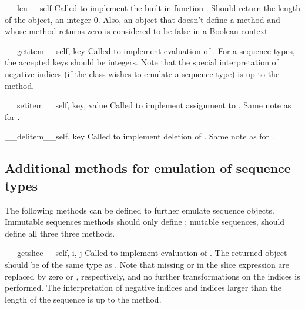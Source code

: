 \begin{methoddescni}{__len__}{self}
Called to implement the built-in function
.  Should return the length of the
object, an integer \code{>=} 0.  Also, an object that doesn't define a
 method and whose  method
returns zero is considered to be false in a Boolean context.
\end{methoddescni}

\begin{methoddescni}{__getitem__}{self, key}
Called to implement evaluation of .
For a sequence types, the accepted keys should be integers.  Note that the
special interpretation of negative indices (if the class wishes to
emulate a sequence type) is up to the  method.
\end{methoddescni}

\begin{methoddescni}{__setitem__}{self, key, value}
Called to implement assignment to .  Same
note as for .
\end{methoddescni}

\begin{methoddescni}{__delitem__}{self, key}
Called to implement deletion of .  Same
note as for .
\end{methoddescni}


\subsection{Additional methods for emulation of sequence types%
  \label{sequence-methods}}

The following methods can be defined to further emulate sequence
objects.  Immutable sequences methods should only define
; mutable sequences, should define all three
three methods.

\begin{methoddescni}{__getslice__}{self, i, j}
Called to implement evaluation of .
The returned object should be of the same type as .  Note
that missing  or  in the slice expression are replaced
by zero or , respectively, and no further
transformations on the indices is performed.  The interpretation of
negative indices and indices larger than the length of the sequence is
up to the method.
\end{methoddescni}

